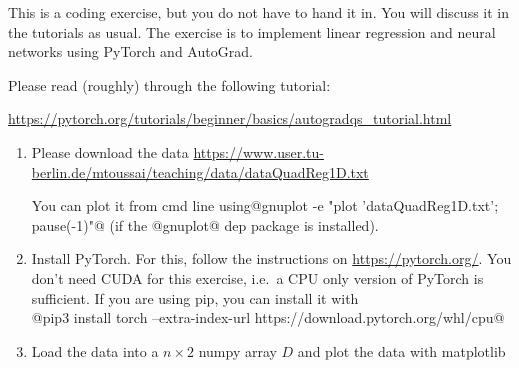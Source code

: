 

This is a coding exercise, but you do not have to hand it in. You will discuss it in the tutorials as usual. The exercise is to implement linear regression and neural networks using PyTorch and AutoGrad.

Please read (roughly) through the following tutorial:

\url{https://pytorch.org/tutorials/beginner/basics/autogradqs_tutorial.html}


\begin{enumerate}
\item Please download the data
  \url{https://www.user.tu-berlin.de/mtoussai/teaching/data/dataQuadReg1D.txt}

You can plot it from cmd line using\newline @gnuplot -e "plot 'dataQuadReg1D.txt'; pause(-1)"@  (if the @gnuplot@ dep package is installed).

\item Install PyTorch. For this, follow the instructions on \url{https://pytorch.org/}. You don't need CUDA for this exercise, i.e.\ a CPU only version of PyTorch is sufficient. If you are using pip, you can install it with \\ @pip3 install torch --extra-index-url https://download.pytorch.org/whl/cpu@

\item Load the data into a $n\times 2$ numpy array $D$ and plot the data with matplotlib


\end{enumerate}
